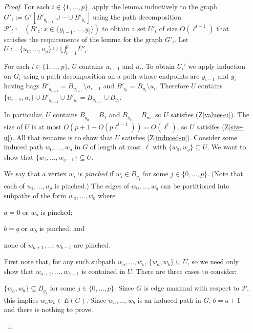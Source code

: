 \documentclass[kpfonts]{patmorin}
\theoremstyle{named}
\begin{document}
\begin{proof}
    For each $i\in\{1,\ldots,p\}$, apply the lemma inductively to the graph $G'_i:=G'[B'_{y_{i-1}}\cup\cdots\cup B'_{y_i}]$ using the path decomposition $\mathcal{P}'_i:=(B'_x:x\in\{y_{i-1},\ldots,y_i\})$ to obtain a set $U'_i$ of size $O(\ell^{t-1})$ that satisfies the requirements of the lemma for the graph $G'_i$. Let $U:=\{u_0,\ldots,u_p\}\cup\bigcup_{i=1}^p U'_i$.

    For each $i\in\{1,\ldots,p\}$, $U$ contains $u_{i-1}$ and $u_i$.
    To obtain $U_i'$ we apply induction on $G_i$ using a path decomposition on a path whose endpoints are $y_{i-1}$ and $y_i$ having bags $B'_{y_{i-1}}=B_{y_{i-1}}\setminus u_{i-1}$ and $B'_{y_{i}}=B_{y_{i}}\setminus u_{i}$.  Therefore $U$ contains $\{u_{i-1},u_i\}\cup B'_{y_{i-1}}\cup B'_{y_i}=B_{y_{i-1}}\cup B_{y_i}$.

    In particular, $U$ contains $B_{y_0}=B_1$ and $B_{y_p}=B_m$, so $U$ satisfies (Z\ref{values-u}).  The size of $U$ is at most $O(p+1+O(p\ell^{t-1}))=O(\ell^{t})$, so $U$ satisifes (Z\ref{size-u}).  All that remains is to show that $U$ satisfies (Z\ref{induced-u}).  Consider some induced path $w_0,\ldots,w_q$ in $G$ of length at most $\ell$ with $\{w_0,w_q\}\subseteq U$.  We want to show that $\{w_1,\ldots,w_{q-1}\}\subseteq U$.

    We say that a vertex $w_i$ is \emph{pinched} if $w_i\in B_{y_j}$ for some $j\in\{0,\ldots,p\}$. (Note that each of $u_1,\ldots,u_p$ is pinched.) The edges of $w_0,\ldots,w_q$ can be partitioned into subpaths of the form $w_{a},\ldots,w_{b}$ where
    \begin{inparaenum}[(i)]
        \item $a=0$ or $w_a$ is pinched;
        \item $b=q$ or $w_b$ is pinched; and
        \item none of $w_{a+1},\ldots,w_{b-1}$ are pinched.
    \end{inparaenum}
    First note that, for any such subpath $w_a,\ldots,w_b$, $\{w_a,w_b\}\subseteq U$, so we need only show that $w_{a+1},\ldots,w_{b-1}$ is contained in $U$.  There are three cases to consider:

    \begin{compactenum}
       \item $\{w_a,w_b\}\subseteq B_{y_j}$ for some $j\in\{0,\ldots,p\}$.  Since $G$ is edge maximal with respect to $\mathcal{P}$, this implies  $w_aw_b\in E(G)$. Since $w_a,\ldots,w_b$ is an induced path in $G$, $b=a+1$ and there is nothing to prove.


\end{compactenum}
\end{proof}
\end{document}
